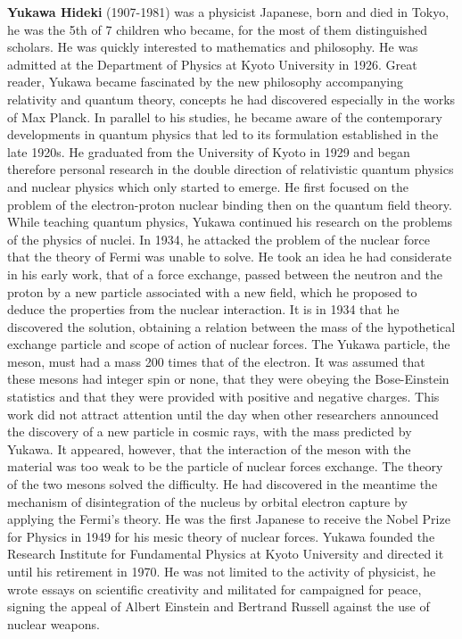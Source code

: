 \textbf{Yukawa Hideki} (1907-1981) was a physicist Japanese, born and died in Tokyo, he was the 5th of 7 children who became, for the most of them distinguished scholars. He was quickly interested to mathematics and philosophy. He was admitted at the Department of Physics at Kyoto University in 1926. Great reader, Yukawa became fascinated by the new philosophy accompanying relativity and quantum theory, concepts he had discovered especially in the works of Max Planck. In parallel to his studies, he became aware of the contemporary developments in quantum physics that led to its formulation established in the late 1920s. He graduated from the University of Kyoto in 1929 and began therefore personal research in the double direction of relativistic quantum physics and nuclear physics which only started to emerge. He first focused on the problem of the electron-proton nuclear binding then on the quantum field theory. While teaching quantum physics, Yukawa continued his research on the problems of the physics of nuclei. In 1934, he attacked the problem of the nuclear force that the theory of Fermi was unable to solve. He took an idea he had considerate in his early work, that of a force exchange, passed between the neutron and the proton by a new particle associated with a new field, which he proposed to deduce the properties from the nuclear interaction. It is in  1934 that he discovered the solution, obtaining a relation between the mass of the hypothetical exchange particle and scope of action of nuclear forces. The Yukawa particle, the meson, must had a mass 200 times that of the electron. It was assumed that these mesons had integer spin or none, that they were obeying the Bose-Einstein statistics and that they were provided with positive and negative charges. This work did not attract attention until the day when other researchers announced the discovery of a new particle in cosmic rays, with the mass predicted by Yukawa. It appeared, however, that the interaction of the meson with the material was too weak to be the particle of nuclear forces exchange. The theory of the two mesons solved the difficulty. He had discovered in the meantime the mechanism of disintegration of the nucleus by orbital electron capture by applying the Fermi's theory. He was the first Japanese to receive the Nobel Prize for Physics in 1949 for his mesic theory of nuclear forces. Yukawa founded the Research Institute for Fundamental Physics at Kyoto University and directed it until his retirement in 1970. He was not limited to the activity of physicist, he wrote essays on scientific creativity and militated for campaigned for peace, signing the appeal of Albert Einstein and Bertrand Russell against the use of nuclear weapons.

